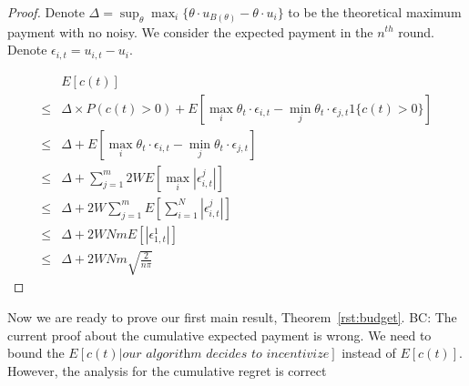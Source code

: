 \documentclass{article}
\newcommand{\bccomment}[1]{{\color{blue}BC: #1}}
\begin{document}
\begin{proof}
Denote $\Delta=\sup_{\theta}\max_{i}\{\theta\cdot u_{B(\theta)}-\theta\cdot u_{i}\}$ to be the theoretical maximum payment with no noisy. We consider the expected payment in the $n^{th}$ round. Denote $\epsilon_{i,t}=u_{i,t}-u_{i}$.

\begin{align}
&E[c(t)] \nonumber \\
\leq & \Delta \times P(c(t)>0) + E[\max_{i}\theta_t\cdot \epsilon_{i,t}-\min_{j}\theta_t\cdot \epsilon_{j,t}1\{c(t)>0\}] \nonumber \\
\leq & \Delta + E[\max_{i}\theta_t\cdot \epsilon_{i,t}-\min_{j}\theta_t\cdot \epsilon_{j,t}] \nonumber \\
\leq & \Delta + \sum_{j=1}^{m}2WE[\max_{i}|\epsilon_{i,t}^{j}|] \nonumber \\
\leq & \Delta + 2W\sum_{j=1}^{m}E\left[\sum_{i=1}^{N}|\epsilon_{i,t}^{j}|\right] \nonumber \\
\leq & \Delta + 2WNm E[|\epsilon_{1,t}^{1}|] \nonumber \\
\leq & \Delta + 2WNm \sqrt{\frac{2}{n\pi}} \nonumber
\end{align}

\end{proof}



Now we are ready to prove our first main result, Theorem~\ref{rst:budget}. \bccomment{The current proof about the cumulative expected payment is wrong. We need to bound the $E[c(t)|\textit{our algorithm decides to incentivize}]$ instead of $E[c(t)]$. However, the analysis for the cumulative regret is correct}
\end{document}
